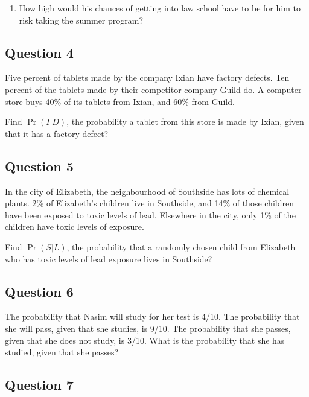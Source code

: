\documentclass[
  11pt,
]{article}
\providecommand{\tightlist}{%
  \setlength{\itemsep}{0pt}\setlength{\parskip}{0pt}}
\begin{document}
\begin{enumerate}
\def\labelenumi{\arabic{enumi}.}
\setcounter{enumi}{2}
\tightlist
\item
  How high would his chances of getting into law school have to be for
  him to risk taking the summer program?
\end{enumerate}

\hypertarget{question-4}{%
\subsection{Question 4}\label{question-4}}

Five percent of tablets made by the company Ixian have factory defects.
Ten percent of the tablets made by their competitor company Guild do. A
computer store buys 40\% of its tablets from Ixian, and 60\% from Guild.

Find \(\Pr(I | D)\), the probability a tablet from this store is made by
Ixian, given that it has a factory defect?

\hypertarget{question-5}{%
\subsection{Question 5}\label{question-5}}

In the city of Elizabeth, the neighbourhood of Southside has lots of
chemical plants. 2\% of Elizabeth's children live in Southside, and 14\%
of those children have been exposed to toxic levels of lead. Elsewhere
in the city, only 1\% of the children have toxic levels of exposure.

Find \(\Pr(S | L)\), the probability that a randomly chosen child from
Elizabeth who has toxic levels of lead exposure lives in Southside?

\hypertarget{question-6}{%
\subsection{Question 6}\label{question-6}}

The probability that Nasim will study for her test is 4/10. The
probability that she will pass, given that she studies, is 9/10. The
probability that she passes, given that she does not study, is 3/10.
What is the probability that she has studied, given that she passes?

\hypertarget{question-7}{%
\subsection{Question 7}\label{question-7}}
\end{document}
